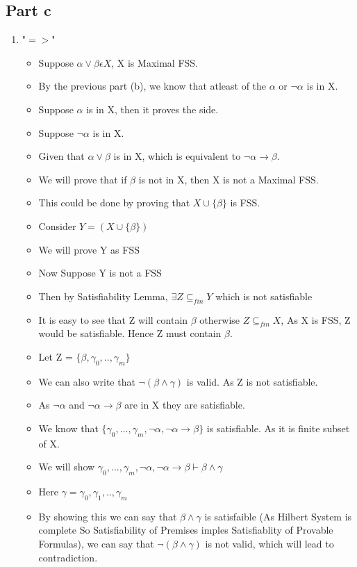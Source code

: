 \documentclass[12pt]{scrartcl}
\begin{document}
\subsection{Part c}
\begin{enumerate}
    \item "$=>$"
    \begin{itemize}
    \item Suppose $\alpha \vee \beta \epsilon X$, X is Maximal FSS.
    \item By the previous part (b), we know that atleast of the $\alpha$ or $\neg \alpha$ is in X.
    \item Suppose $\alpha$ is in X, then it proves the side.
    \item Suppose $\neg \alpha$ is in X.
    \item Given that $\alpha \vee \beta$ is in X, which is equivalent to $\neg \alpha \rightarrow \beta$.
    \item We will prove that if $\beta$ is not in X, then X is not a Maximal FSS.
    \item This could be done by proving that $X \cup \{\beta\}$ is FSS.
    \item Consider $Y = (X \cup \{\beta\})$
    \item We will prove Y as FSS
    \item Now Suppose Y is not a FSS
    \item Then by Satisfiability Lemma, $\exists Z \subseteq_{fin} Y$ which is not satisfiable
    \item It is easy to see that Z will contain $\beta$ otherwise $Z \subseteq_{fin} X$, As X is FSS, Z would be satisfiable. Hence Z must contain $\beta$.
    \item Let Z = $\{\beta,\gamma_{0},..,\gamma_{m}\}$
    \item We can also write that $\neg (\beta \wedge \gamma)$ is valid. As Z is not satisfiable.
    \item As $\neg \alpha$ and $\neg \alpha \rightarrow \beta$ are in X they are satisfiable.
    \item We know that $\{\gamma_{0},...,\gamma_{m},\neg \alpha,\neg \alpha \rightarrow \beta\}$ is satisfiable. As it is finite subset of X.
    \item We will show $\gamma_{0},...,\gamma_{m},\neg \alpha,\neg \alpha \rightarrow \beta \vdash \beta \wedge \gamma$
    \item Here $\gamma=\gamma_{0},\gamma_{1},..,\gamma_{m}$ 
    \item By showing this we can say that $\beta \wedge \gamma$ is satisfaible (As Hilbert System is complete So Satisfiability of Premises imples Satisfiablity of Provable Formulas), we can say that $\neg (\beta \wedge \gamma)$ is not valid, which will lead to contradiction.

\end{itemize}
\end{enumerate}
\end{document}
